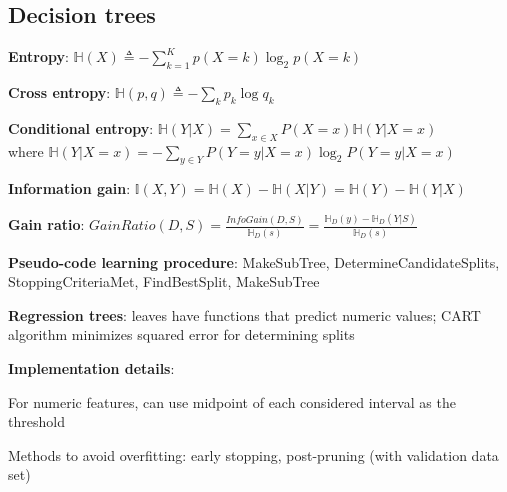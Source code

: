 \documentclass[letterpaper,fontsize=5pt]{scrartcl}
\renewenvironment{enumerate}[1]{\begin{compactenum}#1}{\end{compactenum}}
\theoremstyle{definition}
\begin{document}
\begin{multicols}{2}
\section{Decision trees}
	\begin{enumerate}
		\item \textbf{Entropy}: $\mathbb{H}(X) \triangleq -\sum\limits_{k=1}^K p(X=k) \log_{2} p(X=k)$
		\item \textbf{Cross entropy}: $\mathbb{H}(p,q) \triangleq - \sum\limits_{k} p_k \log q_k$
		\item \textbf{Conditional entropy}: $\mathbb{H}(Y|X) = \sum\limits_{x\in X} P(X=x)\mathbb{H}(Y|X=x)$ \\ where $\mathbb{H}(Y|X=x) = - \sum\limits_{y\in Y} P(Y=y|X=x) \log_{2}P(Y=y|X=x)$
		\item \textbf{Information gain}: $\mathbb{I}(X,Y) = \mathbb{H}(X) - \mathbb{H}(X|Y) = \mathbb{H}(Y) - \mathbb{H}(Y|X)$
		\item \textbf{Gain ratio}: $GainRatio(D,S) = \frac{InfoGain(D,S)}{\mathbb{H}_D(s)} = \frac{\mathbb{H}_D(y) - \mathbb{H}_D(Y|S)}{\mathbb{H}_D(s)}$
		\item \textbf{Pseudo-code learning procedure}: MakeSubTree, DetermineCandidateSplits, StoppingCriteriaMet, FindBestSplit, MakeSubTree
		\item \textbf{Regression trees}: leaves have functions that predict numeric values; CART algorithm minimizes squared error for determining splits
		\item \textbf{Implementation details}:
			\begin{enumerate}
				\item For numeric features, can use midpoint of each considered interval as the threshold
				\item Methods to avoid overfitting: early stopping, post-pruning (with validation data set)
			\end{enumerate}
	\end{enumerate}

\end{multicols}
\end{document}

